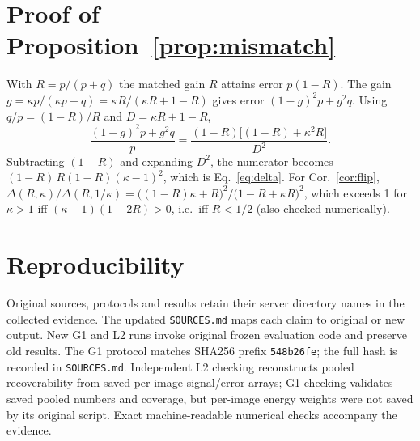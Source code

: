 \section{Proof of Proposition~\ref{prop:mismatch}}\label{app:proof}
With $R=p/(p+q)$ the matched gain $R$ attains error $p(1-R)$. The gain
$g=\kappa p/(\kappa p+q)=\kappa R/(\kappa R+1-R)$ gives error
$(1-g)^2p+g^2q$. Using $q/p=(1-R)/R$ and $D=\kappa R+1-R$,
\[
\frac{(1-g)^2p+g^2q}{p}=\frac{(1-R)\big[(1-R)+\kappa^2R\big]}{D^2}.
\]
Subtracting $(1-R)$ and expanding $D^2$, the numerator becomes
$(1-R)\,R(1-R)(\kappa-1)^2$, which is Eq.~\eqref{eq:delta}.
For Cor.~\ref{cor:flip},
$\Delta(R,\kappa)/\Delta(R,1/\kappa)=\big((1-R)\kappa+R\big)^2/\big(1-R+\kappa R\big)^2$,
which exceeds 1 for $\kappa>1$ iff $(\kappa-1)(1-2R)>0$, i.e.\ iff $R<1/2$
(also checked numerically).

\section{Reproducibility}
Original sources, protocols and results retain their server directory
names in the collected evidence. The updated \texttt{SOURCES.md} maps each
claim to original or new output. New G1 and L2 runs invoke original frozen
evaluation code and preserve old results. The G1 protocol matches SHA256
prefix \texttt{548b26fe}; the full hash is recorded in \texttt{SOURCES.md}.
Independent L2 checking reconstructs pooled recoverability from saved
per-image signal/error arrays; G1 checking validates saved pooled numbers
and coverage, but per-image energy weights were not saved by its original
script. Exact machine-readable numerical checks accompany the evidence.

